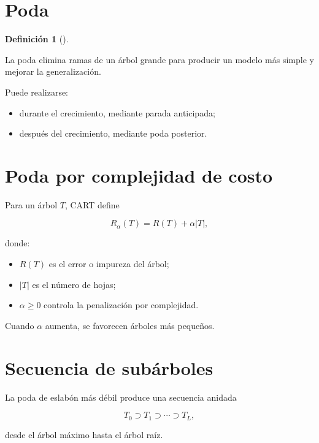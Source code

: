 \documentclass[
  spanish,
  11pt,
  letterpaper,
  DIV=11,
  numbers=noendperiod]{scrreprt}
\providecommand{\tightlist}{%
  \setlength{\itemsep}{0pt}\setlength{\parskip}{0pt}}
\theoremstyle{definition}
\newtheorem{definition}{Definición}[chapter]
\theoremstyle{plain}
\theoremstyle{definition}
\theoremstyle{remark}
\begin{document}
\section{Poda}\label{poda}

\begin{definition}[]\protect\hypertarget{def-poda}{}\label{def-poda}

La poda elimina ramas de un árbol grande para producir un modelo más
simple y mejorar la generalización.

\end{definition}

Puede realizarse:

\begin{itemize}
\tightlist
\item
  durante el crecimiento, mediante parada anticipada;
\item
  después del crecimiento, mediante poda posterior.
\end{itemize}

\section{Poda por complejidad de
costo}\label{poda-por-complejidad-de-costo}

Para un árbol \(T\), CART define

\[
R_\alpha(T)
=
R(T)+\alpha |T|,
\]

donde:

\begin{itemize}
\tightlist
\item
  \(R(T)\) es el error o impureza del árbol;
\item
  \(|T|\) es el número de hojas;
\item
  \(\alpha\geq 0\) controla la penalización por complejidad.
\end{itemize}

Cuando \(\alpha\) aumenta, se favorecen árboles más pequeños.

\section{Secuencia de subárboles}\label{secuencia-de-subuxe1rboles}

La poda de eslabón más débil produce una secuencia anidada

\[
T_0\supset T_1\supset\cdots\supset T_L,
\]

desde el árbol máximo hasta el árbol raíz.
\end{document}
